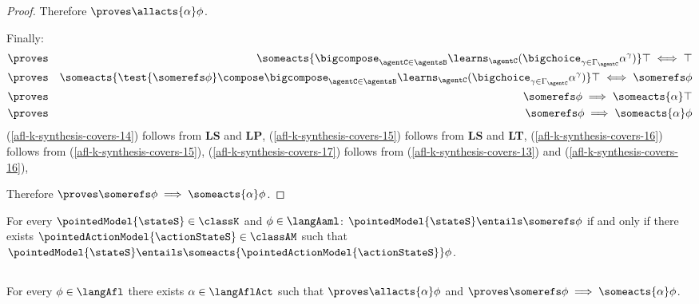 \documentclass[twoside]{aiml14}
\begin{document}
\begin{proof}
      Therefore $\proves \allacts{\alpha} \phi$.

      Finally:
      \begin{eqnarray}
      &\proves& \someacts{\bigcompose_{\agentC \in \agentsB} \learns_\agentC (\bigchoice_{\gamma \in \Gamma_\agentC} \alpha^\gamma)} \top \iff \top\label{afl-k-synthesis-covers-14}\\
      &\proves& \someacts{\test{\somerefs \phi} \compose \bigcompose_{\agentC \in \agentsB} \learns_\agentC (\bigchoice_{\gamma \in \Gamma_\agentC} \alpha^\gamma)} \top \iff \somerefs \phi\label{afl-k-synthesis-covers-15}\\
      &\proves& \somerefs \phi \implies \someacts{\alpha} \top\label{afl-k-synthesis-covers-16}\\
      &\proves& \somerefs \phi \implies \someacts{\alpha} \phi\label{afl-k-synthesis-covers-17}
      \end{eqnarray}
      (\ref{afl-k-synthesis-covers-14}) follows from {\bf LS} and {\bf LP},
      (\ref{afl-k-synthesis-covers-15}) follows from {\bf LS} and {\bf LT},
      (\ref{afl-k-synthesis-covers-16}) follows from (\ref{afl-k-synthesis-covers-15}),
      (\ref{afl-k-synthesis-covers-17}) follows from (\ref{afl-k-synthesis-covers-13}) and (\ref{afl-k-synthesis-covers-16}),

      Therefore $\proves \somerefs \phi \implies \someacts{\alpha} \phi$.
  \end{proof}

  \begin{corollary}
      For every $\pointedModel{\stateS} \in \classK$ and $\phi \in \langAaml$: 
      $\pointedModel{\stateS} \entails \somerefs \phi$ if and only if 
      there exists $\pointedActionModel{\actionStateS} \in \classAM$ 
      such that $\pointedModel{\stateS} \entails \someacts{\pointedActionModel{\actionStateS}} \phi$.
  \end{corollary}

  \subsection{\classKFF{}}

  \begin{proposition}\label{afl-kff-synthesis}
      For every $\phi \in \langAfl$ there exists $\alpha \in \langAflAct$ such that $\proves \allacts{\alpha} \phi$ and $\proves \somerefs \phi \implies \someacts{\alpha} \phi$.
  \end{proposition} 
\end{document}
